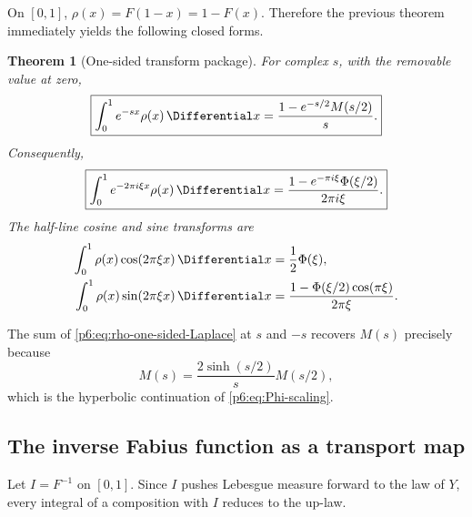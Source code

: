 \documentclass[11pt]{article}
\newtheorem{theorem}{Theorem}[section]
\theoremstyle{definition}
\theoremstyle{remark}
\begin{document}
On \([0,1]\), \(\rho(x)=F(1-x)=1-F(x)\).  Therefore the previous theorem immediately
yields the following closed forms.

\begin{theorem}[One-sided transform package]\label{p6:thm:one-sided}
For complex \(s\), with the removable value at zero,
\begin{equation}
 \boxed{
 \int_0^1e^{-sx}\rho(x)\,\Differential x
 =\frac{1-e^{-s/2}M(s/2)}{s}.
 }                                                           \label{p6:eq:rho-one-sided-Laplace}
\end{equation}
Consequently,
\begin{equation}
 \boxed{
 \int_0^1e^{-2\pi i\xi x}\rho(x)\,\Differential x
 =\frac{1-e^{-\pi i\xi}\Phi(\xi/2)}{2\pi i\xi}.
 }                                                           \label{p6:eq:rho-one-sided-Fourier}
\end{equation}
The half-line cosine and sine transforms are
\begin{align}
 \int_0^1\rho(x)\cos(2\pi\xi x)\,\Differential x
 &=\frac12\Phi(\xi),                                        \label{p6:eq:rho-half-cos}\\
 \int_0^1\rho(x)\sin(2\pi\xi x)\,\Differential x
 &=\frac{1-\Phi(\xi/2)\cos(\pi\xi)}{2\pi\xi}.             \label{p6:eq:rho-half-sin}
\end{align}
\end{theorem}

The sum of \eqref{p6:eq:rho-one-sided-Laplace} at \(s\) and \(-s\) recovers
\(M(s)\) precisely because
\begin{equation}
 M(s)=\frac{2\sinh(s/2)}{s}M(s/2),                           \label{p6:eq:M-scaling}
\end{equation}
which is the hyperbolic continuation of \eqref{p6:eq:Phi-scaling}.

\subsection{The inverse Fabius function as a transport map}

Let \(I=F^{-1}\) on \([0,1]\).  Since \(I\) pushes Lebesgue measure forward to the law
of \(Y\), every integral of a composition with \(I\) reduces to the up-law.
\end{document}
